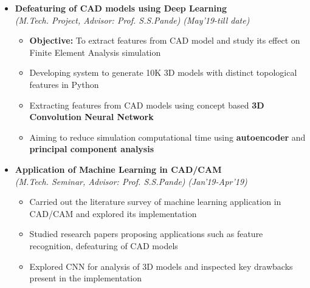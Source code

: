 \documentclass[a4paper,10pt]{article}
\begin{document}
\begin{itemize}%
\item \textbf{Defeaturing of CAD models using Deep Learning}\\
\emph{(M.Tech. Project, Advisor: Prof. S.S.Pande)} \hfill \emph{(May'19-till date)}
	\begin{itemize}[noitemsep,nolistsep]
	\item \textbf{Objective:} To extract features from CAD model and study its effect on Finite Element Analysis simulation
	\item Developing system to generate 10K 3D models with distinct topological features in Python
	\item Extracting features from CAD models using concept based \textbf{3D Convolution Neural Network}
	\item Aiming to reduce simulation computational time using \textbf{autoencoder} and \textbf{principal component analysis}
    \end{itemize}
    
\item \textbf{Application of Machine Learning in CAD/CAM} \\
\emph{(M.Tech. Seminar, Advisor: Prof. S.S.Pande)} \hfill \emph{(Jan'19-Apr'19)}
	\begin{itemize}[noitemsep,nolistsep]
    \item Carried out the literature survey of machine learning application in CAD/CAM and explored its implementation %
    \item Studied research papers proposing applications such as feature recognition, defeaturing of CAD models
    \item Explored CNN for analysis of 3D models and inspected key drawbacks present in the implementation
	\end{itemize}
\end{itemize}
\end{document}
